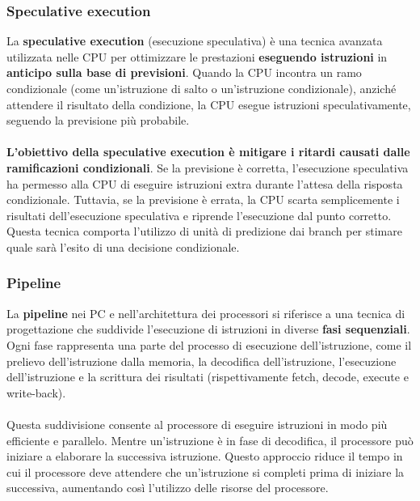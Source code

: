 \begin{frame}
	\frametitle{ Speculative execution}

		La \textbf{speculative execution} (esecuzione speculativa) è una tecnica avanzata utilizzata nelle CPU per ottimizzare le prestazioni \textbf{eseguendo istruzioni} in \textbf{anticipo sulla base di previsioni}. Quando la CPU incontra un ramo condizionale (come un'istruzione di salto o un'istruzione condizionale), anziché attendere il risultato della condizione, la CPU esegue istruzioni speculativamente, seguendo la previsione più probabile.\\~\\
		\textbf{L'obiettivo della speculative execution è mitigare i ritardi causati dalle ramificazioni condizionali}. Se la previsione è corretta, l'esecuzione speculativa ha permesso alla CPU di eseguire istruzioni extra durante l'attesa della risposta condizionale. Tuttavia, se la previsione è errata, la CPU scarta semplicemente i risultati dell'esecuzione speculativa e riprende l'esecuzione dal punto corretto.\\
		Questa tecnica comporta l'utilizzo di unità di predizione dai branch per stimare quale sarà l'esito di una decisione condizionale.

\end{frame}


\begin{frame}
	\frametitle{ Pipeline}

		La \textbf{pipeline} nei PC e nell'architettura dei processori si riferisce a una tecnica di progettazione che suddivide l'esecuzione di istruzioni in diverse \textbf{fasi sequenziali}. Ogni fase rappresenta una parte del processo di esecuzione dell'istruzione, come il prelievo dell'istruzione dalla memoria, la decodifica dell'istruzione, l'esecuzione dell'istruzione e la scrittura dei risultati (rispettivamente fetch, decode, execute e write-back).\\~\\
		Questa suddivisione consente al processore di eseguire istruzioni in modo più efficiente e parallelo. Mentre un'istruzione è in fase di decodifica, il processore può iniziare a elaborare la successiva istruzione. Questo approccio riduce il tempo in cui il processore deve attendere che un'istruzione si completi prima di iniziare la successiva, aumentando così l'utilizzo delle risorse del processore.

\end{frame}


